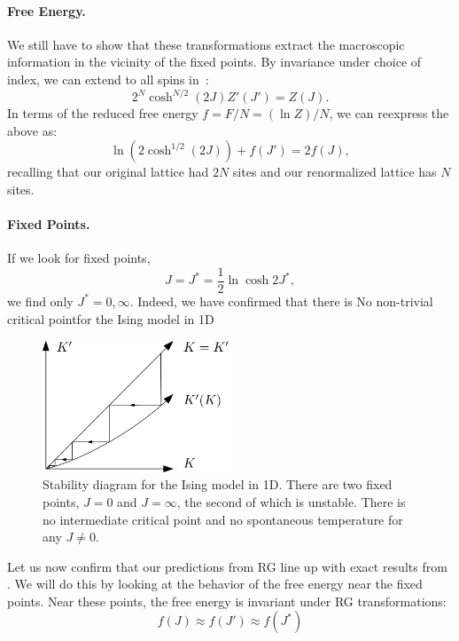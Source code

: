 \paragraph{Free Energy.}
We still have to show that these transformations extract the
macroscopic information in the vicinity of the fixed points. By
invariance under choice of index, we can extend
 to all spins
in~:
\begin{equation}%
  2^N \cosh^{N/2}(2J) Z'(J')=Z(J).
\end{equation}%
In terms of the reduced free energy $f = F/N= (\ln Z)/N$, we can
reexpress the above as:%
\begin{equation}%
  \ln \left( 2 \cosh^{1/2}(2J)\right) + f(J')=2 f(J),\label{eq:decimation-f-transformation-0}
\end{equation}%
recalling that our original lattice had $2N$ sites and our
renormalized lattice has $N$ sites.

\paragraph{Fixed Points.}
If we look for fixed points,%
\begin{equation}%
  J=J^*=\frac{1}{2} \ln \cosh 2J^*,
\end{equation}%
we find only $J^*=0, \infty$. Indeed, we have confirmed that there is
No non-trivial critical pointfor the Ising model in 1D

\begin{figure}[ht]
  \centering
  \includegraphics[width=0.5\textwidth]{figures/ising-1d-stability.png}
  \caption{Stability diagram for the Ising model in 1D. There are two
    fixed points, $J=0$ and $J=\infty$, the second of which is
    unstable. There is no intermediate critical point and no
    spontaneous temperature for any
    $J\neq 0$.\label{fig:ising-1d-fixed-points}}
\end{figure}

Let us now confirm that our predictions from RG line up with exact
results from . We will do this by looking at
the behavior of the free energy near the fixed points. Near these
points, the free energy is invariant under RG transformations:%
\begin{equation}%
  f(J)\approx f(J') \approx f(J^*)
\end{equation}%

